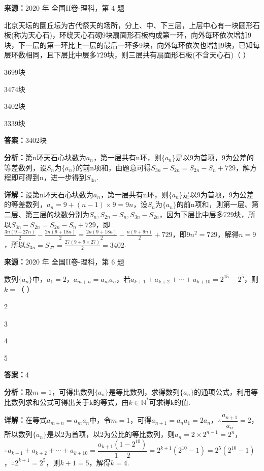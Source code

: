 \begin{question}[points=5]
\textbf{来源：}2020 年 全国II卷-理科，第 4 题\par
北京天坛的圜丘坛为古代祭天的场所，分上、中、下三层，上层中心有一块圆形石板(称为天心石)，环绕天心石砌9块扇面形石板构成第一环，向外每环依次增加9块，下一层的第一环比上一层的最后一环多9块，向外每环依次也增加9块，已知每层环数相同，且下层比中层多729块，则三层共有扇面形石板(不含天心石)（ ）
\begin{choices}
  \item 3699块
  \item 3474块
  \item 3402块
  \item 3339块
\end{choices}
\begin{solution}
\textbf{答案：}3402块

\textbf{分析：}第n环天石心块数为$a_n$，第一层共有n环，则$\{a_n\}$是以9为首项，9为公差的等差数列，设$S_n$为$\{a_n\}$的前n项和，由题意可得$S_{3n}-S_{2n}=S_{2n}-S_n+729$，解方程即可得到n，进一步得到$S_{3n}$.

\textbf{详解：}设第n环天石心块数为$a_n$，第一层共有n环，则$\{a_n\}$是以9为首项，9为公差的等差数列，$a_n=9+(n-1)\times9=9n$，设$S_n$为$\{a_n\}$的前n项和，则第一层、第二层、第三层的块数分别为$S_n,S_{2n}-S_n,S_{3n}-S_{2n}$，因为下层比中层多729块，所以$S_{3n}-S_{2n}=S_{2n}-S_n+729$，即$\frac{3n(9+27n)}{2}-\frac{2n(9+18n)}{2}=\frac{2n(9+18n)}{2}-\frac{n(9+9n)}{2}+729$，即$9n^2=729$，解得$n=9$，所以$S_{3n}=S_{27}=\frac{27(9+9\times27)}{2}=3402$.
\end{solution}
\end{question}

\begin{question}[points=5]
\textbf{来源：}2020 年 全国II卷-理科，第 6 题\par
数列$\{a_n\}$中，$a_1=2$，$a_{m+n}=a_m a_n$，若$a_{k+1}+a_{k+2}+\cdots+a_{k+10}=2^{15}-2^5$，则$k=$（ ）
\begin{choices}
  \item 2
  \item 3
  \item 4
  \item 5
\end{choices}
\begin{solution}
\textbf{答案：}4

\textbf{分析：}取$m=1$，可得出数列$\{a_n\}$是等比数列，求得数列$\{a_n\}$的通项公式，利用等比数列求和公式可得出关于k的等式，由$k\in\mathbb{N}^*$可求得k的值.

\textbf{详解：}在等式$a_{m+n}=a_m a_n$中，令$m=1$，可得$a_{n+1}=a_n a_1=2a_n$，$\therefore\dfrac{a_{n+1}}{a_n}=2$，所以数列$\{a_n\}$是以2为首项，以2为公比的等比数列，则$a_n=2\times2^{n-1}=2^n$，$\therefore a_{k+1}+a_{k+2}+\cdots+a_{k+10}=\dfrac{a_{k+1}(1-2^{10})}{1-2}=2^{k+1}(2^{10}-1)=2^5(2^{10}-1)$，$\therefore2^{k+1}=2^5$，则$k+1=5$，解得$k=4$.
\end{solution}
\end{question}

